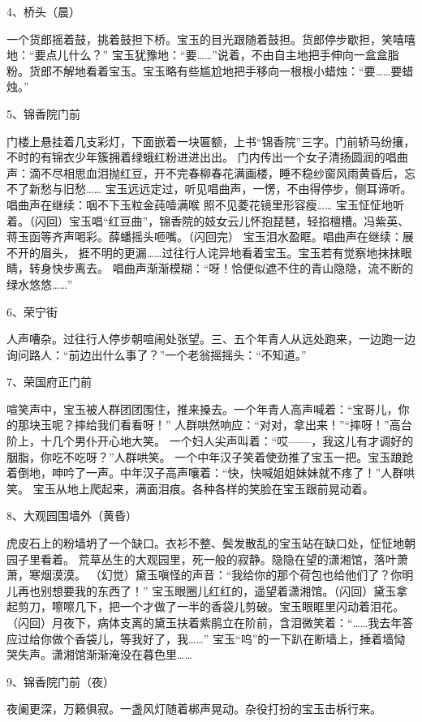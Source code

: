 4、桥头（晨）\par
一个货郎摇着鼓，挑着鼓担下桥。宝玉的目光跟随着鼓担。货郎停步歇担，笑嘻嘻地：“要点儿什么？”
宝玉犹豫地：“要……”说着，不由自主地把手伸向一盒盒脂粉。货郎不解地看着宝玉。宝玉略有些尴尬地把手移向一根根小蜡烛：“要……要蜡烛。”

5、锦香院门前\par
门楼上悬挂着几支彩灯，下面嵌着一块匾额，上书“锦香院”三字。门前轿马纷攘，不时的有锦衣少年簇拥着绿蛾红粉进进出出。
门内传出一个女子清扬圆润的唱曲声：滴不尽相思血泪抛红豆，开不完春柳春花满画楼，睡不稳纱窗风雨黄昏后，忘不了新愁与旧愁……
宝玉远远定过，听见唱曲声，一愣，不由得停步，侧耳谛听。唱曲声在继续：咽不下玉粒金莼噎满喉 照不见菱花镜里形容瘦……
宝玉怔怔地听着。（闪回）宝玉唱“红豆曲”，锦香院的妓女云儿怀抱琵琶，轻掐檀槽。冯紫英、蒋玉函等齐声喝彩。薛蟠摇头咂嘴。（闪回完）
宝玉泪水盈眶。唱曲声在继续：展不开的眉头， 捱不明的更漏……过往行人诧异地看着宝玉。宝玉若有觉察地抹抹眼睛，转身快步离去。
唱曲声渐渐模糊：“呀！恰便似遮不住的青山隐隐，流不断的绿水悠悠……”

6、荣宁街\par
人声嘈杂。过往行人停步朝喧闹处张望。三、五个年青人从远处跑来，一边跑一边询问路人：“前边出什么事了？”一个老翁摇摇头：“不知道。”

7、荣国府正门前\par
喧笑声中，宝玉被人群团团围住，推来搡去。一个年青人高声喊着：“宝哥儿，你的那块玉呢？摔给我们看看呀！”
人群哄然响应：“对对，拿出来！”“摔呀！”高台阶上，十几个男仆开心地大笑。
一个妇人尖声叫着：“哎——，我这儿有才调好的胭脂，你吃不吃呀？”人群哄笑。
一个中年汉子笑着使劲推了宝玉一把。宝玉踉跄着倒地，呻吟了一声。中年汉子高声嚷着：“快，快喊姐姐妹妹就不疼了！”人群哄笑。
宝玉从地上爬起来，满面泪痕。各种各样的笑脸在宝玉跟前晃动着。

8、大观园围墙外（黄昏）\par
虎皮石上的粉墙坍了一个缺口。衣衫不整、鬓发散乱的宝玉站在缺口处，怔怔地朝园子里看着。
荒草丛生的大观园里，死一般的寂静。隐隐在望的潇湘馆，落叶萧萧，寒烟漠漠。
（幻觉）黛玉嗔怪的声音：“我给你的那个荷包也给他们了？你明儿再也别想要我的东西了！”
宝玉眼圈儿红红的，遥望着潇湘馆。（闪回）黛玉拿起剪刀，嚓嚓几下，把一个才做了一半的香袋儿剪破。宝玉眼眶里闪动着泪花。
（闪回）月夜下，病体支离的黛玉扶着紫鹃立在阶前，含泪微笑着：“……我去年答应过给你做个香袋儿，等我好了，我……”
宝玉“呜”的一下趴在断墙上，捶着墙恸哭失声。潇湘馆渐渐淹没在暮色里……

9、锦香院门前（夜）\par
夜阑更深，万籁俱寂。一盏风灯随着梆声晃动。杂役打扮的宝玉击柝行来。

